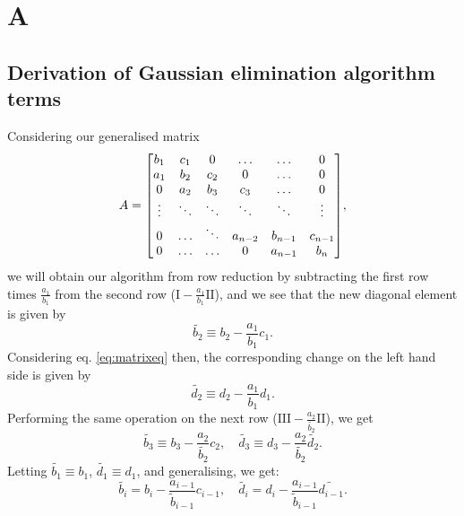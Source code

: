 \onecolumn
\section*{A}
\label{sec:appendix}
\renewcommand{\theequation}{\thesection .\arabic{equation}}

\subsection*{Derivation of Gaussian elimination algorithm terms}
\label{sec:derivgauss}
Considering our generalised matrix
  \[A =
    \mqty[b_1 & c_1 & 0 & \hdots & \hdots & 0 \\
          a_1 & b_2 & c_2 & 0 & \hdots & 0 \\
          0 & a_2 & b_3 & c_3 & \hdots & 0 \\
          \vdots & \ddots & \ddots & \ddots & \ddots & \vdots \\
          0 & \hdots & \ddots & a_{n-2} & b_{n-1} & c_{n-1} \\
          0 & \hdots & \hdots & 0 & a_{n-1} & b_n],
  \]
we will obtain our algorithm from row reduction by subtracting the first row
times $\frac{a_1}{b_1}$ from the second row ($\text{I} - \frac{a_1}{b_1}\text{II}
$), and we see that the new diagonal element is given by
  \[\widetilde{b_2} \equiv b_2 - \frac{a_1}{b_1}c_1.\]
Considering eq. \ref{eq:matrixeq} then, the corresponding change on the left
hand side is given by
  \[\widetilde{d_2} \equiv d_2 - \frac{a_1}{b_1}d_1.\]
Performing the same operation on the next row
($\text{III} - \frac{a_2}{\widetilde{b_2}}\text{II}$), we get
  \[\widetilde{b_3} \equiv b_3 - \frac{a_2}{\widetilde{b_2}}c_2, \quad
  \widetilde{d_3} \equiv d_3 - \frac{a_2}{\widetilde{b_2}}\widetilde{d_2}.
  \]
Letting $\widetilde{b_1} \equiv b_1$, $\widetilde{d_1} \equiv d_1$, and
generalising, we get:
  \begin{equation}
    \widetilde{b_i} = b_i - \frac{a_{i-1}}{\widetilde{b}_{i-1}}c_{i-1}, \quad
    \widetilde{d_i} = d_i - \frac{a_{i-1}}{\widetilde{b}_{i-1}}\widetilde{d_{i-1}}.
  \end{equation}
